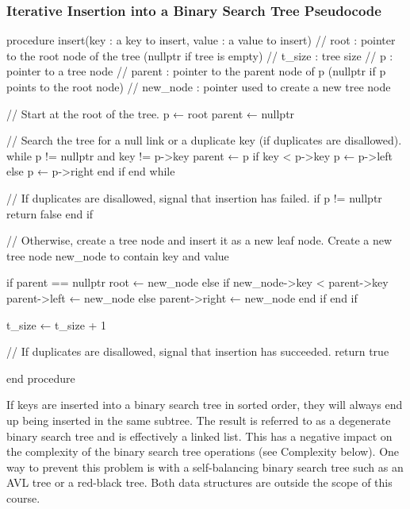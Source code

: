 \documentclass{report}
\begin{document}
    \subsubsection{Iterative Insertion into a Binary Search Tree Pseudocode}
    \bigbreak \noindent 
    \begin{cppcode}
    procedure insert(key : a key to insert, value : a value to insert)
        // root     : pointer to the root node of the tree (nullptr if tree is empty)
        // t_size   : tree size  
        // p        : pointer to a tree node
        // parent   : pointer to the parent node of p (nullptr if p points to the root node)
        // new_node : pointer used to create a new tree node
        
        // Start at the root of the tree.
        p ← root
        parent ← nullptr
        
        // Search the tree for a null link or a duplicate key (if duplicates are disallowed).
        while p != nullptr and key != p->key
            parent ← p
            if key < p->key
                p ← p->left
            else
                p ← p->right
            end if
        end while

        // If duplicates are disallowed, signal that insertion has failed.
        if p != nullptr
            return false
        end if
        
        // Otherwise, create a tree node and insert it as a new leaf node.
        Create a new tree node new_node to contain key and value
        
        if parent == nullptr
            root ← new_node
        else
            if new_node->key < parent->key
                parent->left ← new_node
            else
                parent->right ← new_node
            end if
        end if
        
        t_size ← t_size + 1

        // If duplicates are disallowed, signal that insertion has succeeded. 
        return true

    end procedure
    \end{cppcode}

    \pagebreak \bigbreak \noindent 
    If keys are inserted into a binary search tree in sorted order, they will always end up being inserted in the same subtree. The result is referred to as a degenerate binary search tree and is effectively a linked list. This has a negative impact on the complexity of the binary search tree operations (see Complexity below). One way to prevent this problem is with a self-balancing binary search tree such as an AVL tree or a red-black tree. Both data structures are outside the scope of this course.
    \bigbreak \noindent 
\end{document}
